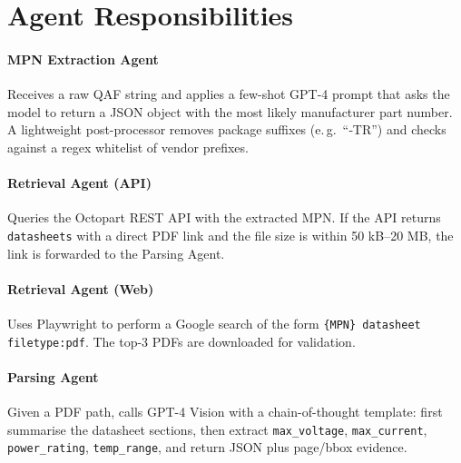 
\section{Agent Responsibilities}
\paragraph{MPN Extraction Agent}  
Receives a raw QAF string and applies a few-shot GPT-4 prompt that asks the model to return a JSON object with the most likely manufacturer part number.  
A lightweight post-processor removes package suffixes (e.\,g.\ “‐TR”) and checks against a regex whitelist of vendor prefixes.

\paragraph{Retrieval Agent (API)}  
Queries the Octopart REST API with the extracted MPN.  
If the API returns \verb|datasheets| with a direct PDF link and the file size is within 50 kB–20 MB, the link is forwarded to the Parsing Agent.

\paragraph{Retrieval Agent (Web)}  
Uses Playwright to perform a Google search of the form  
\texttt{\{MPN\} datasheet filetype:pdf}.  
The top-3 PDFs are downloaded for validation.

\paragraph{Parsing Agent}  
Given a PDF path, calls GPT-4 Vision with a chain-of-thought template: first summarise the datasheet sections, then extract \verb|max_voltage|, \verb|max_current|, \verb|power_rating|, \verb|temp_range|, and return JSON plus page/bbox evidence.

